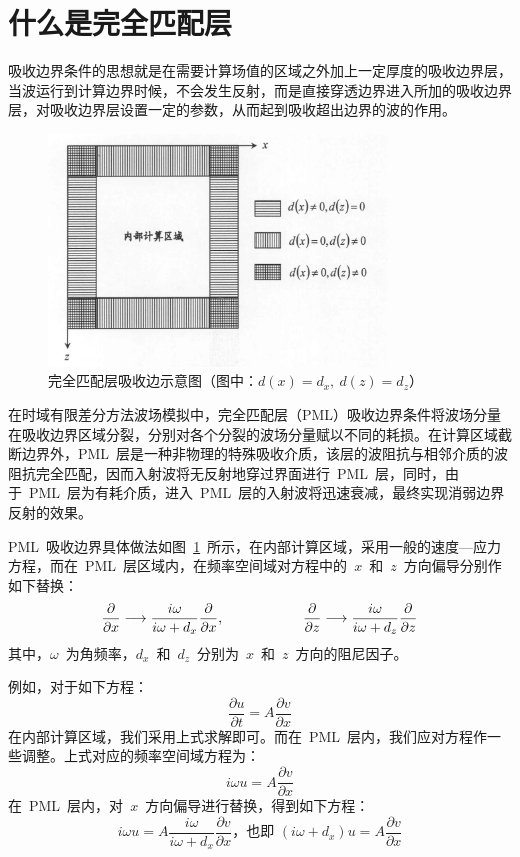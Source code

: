 \documentclass[UTF8]{ctexart}
\begin{document}
\section{什么是完全匹配层}
吸收边界条件的思想就是在需要计算场值的区域之外加上一定厚度的吸收边界层，当波运行到计算边界时候，不会发生反射，而是直接穿透边界进入所加的吸收边界层，对吸收边界层设置一定的参数，从而起到吸收超出边界的波的作用。\par
\begin{figure}[h]
  \centering
  \includegraphics[width=90mm]{./Figure/pml.png}
  \caption{完全匹配层吸收边示意图（图中：$d(x)=d_x,~d(z)=d_z$）}\label{fig:pml}
\end{figure}
在时域有限差分方法波场模拟中，完全匹配层（PML）吸收边界条件将波场分量在吸收边界区域分裂，分别对各个分裂的波场分量赋以不同的耗损。在计算区域截断边界外，PML~层是一种非物理的特殊吸收介质，该层的波阻抗与相邻介质的波阻抗完全匹配，因而入射波将无反射地穿过界面进行~PML~层，同时，由于~PML~层为有耗介质，进入~PML~层的入射波将迅速衰减，最终实现消弱边界反射的效果。\par
PML~吸收边界具体做法如图~\ref{fig:pml}~所示，在内部计算区域，采用一般的速度—应力方程，而在~PML~层区域内，在频率空间域对方程中的~$x$~和~$z$~方向偏导分别作如下替换：
\[ \frac{\partial}{\partial x}\longrightarrow\frac{i\omega}{i\omega+d_x}\frac{\partial}{\partial x},\hspace{20mm} \frac{\partial}{\partial z}\longrightarrow\frac{i\omega}{i\omega+d_z}\frac{\partial}{\partial z} \]
其中，$\omega$~为角频率，$d_x$~和~$d_z$~分别为~$x$~和~$z$~方向的阻尼因子。\par
例如，对于如下方程：
\[ \frac{\partial u}{\partial t}=A\frac{\partial v}{\partial x} \]
在内部计算区域，我们采用上式求解即可。而在~PML~层内，我们应对方程作一些调整。上式对应的频率空间域方程为：
\[ i\omega u=A\frac{\partial v}{\partial x} \]
在~PML~层内，对~$x$~方向偏导进行替换，得到如下方程：
\[ i\omega u=A\frac{i\omega}{i\omega+d_x}\frac{\partial v}{\partial x} \text{，也即~} (i\omega+d_x)u=A\frac{\partial v}{\partial x} \]
\end{document}
